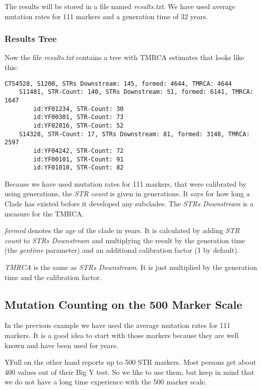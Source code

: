 The results will be stored in a file named \emph{results.txt}.
We have used average mutation rates for 111 markers and a
generation time of 32 years.


\subsubsection*{Results Tree}

Now the file \emph{results.txt} contains a tree with TMRCA
estimates that looks like this:

\begin{verbatim}
CTS4528, S1200, STRs Downstream: 145, formed: 4644, TMRCA: 4644
    S11481, STR-Count: 140, STRs Downstream: 51, formed: 6141, TMRCA: 1647
        id:YF01234, STR-Count: 30
        id:YF00301, STR-Count: 73
        id:YF02016, STR-Count: 52
    S14328, STR-Count: 17, STRs Downstream: 81, formed: 3148, TMRCA: 2597
        id:YF04242, STR-Count: 72
        id:YF00101, STR-Count: 91
        id:YF01010, STR-Count: 82
\end{verbatim}

Because we have used mutation rates for 111 markers, that
were calibrated by using generations, the \emph{STR count}
is given in generations. It says for how long a Clade has
existed before it developed any subclades. The
\emph{STRs Downstream} is a measure for the TMRCA.

\emph{formed} denotes the age of the clade in years. It is
calculated by adding \emph{STR count} to \emph{STRs Downstream}
and multiplying the result by the generation time (the
\emph{gentime} parameter) and an additional calibration
factor (1 by default).

\emph{TMRCA} is the same as \emph{STRs Downstream}. It is
just multiplied by the generation time and the calibration
factor.


\subsection{Mutation Counting on the 500 Marker Scale}

In the previous example we have used the average mutation rates
for 111 markers. It is a good idea to start with those markers
because they are well known and have been used for years.

YFull on the other hand reports up to 500 STR markers. Most persons
get about 400 values out of their Big Y test. So we like to use
them, but keep in mind that we do not have a long time experience
with the 500 marker scale.

